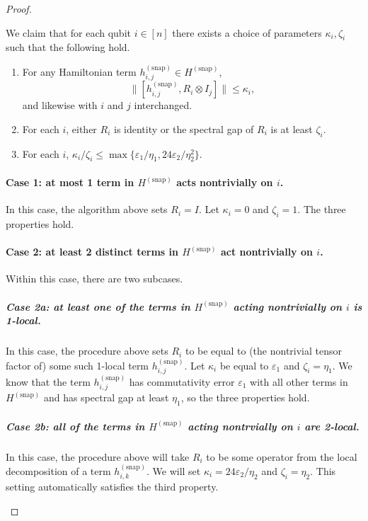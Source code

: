 \documentclass[a4paper,onecolumn,11pt]{quantumarticle}
\theoremstyle{plain}
\newcommand{\eps}{\varepsilon}
\newcommand{\snp}{{(\mathrm{snap})}}
\begin{document}
\begin{proof}
\begin{enumerate}
\begin{enumerate}
    \end{enumerate}
    We claim that for each qubit $i \in [n]$ there exists a choice of parameters $\kappa_i, \zeta_i$ such that the following hold.
    \begin{enumerate}
        \item[1.] For any Hamiltonian term $h^\snp_{i,j} \in H^\snp$,
        \[ \|[ h^\snp_{i,j}, R_i \otimes I_j] \| \leq \kappa_i, \]
        and likewise with $i$ and $j$ interchanged.
        \item[2.] For each $i$, either $R_i$ is identity or the spectral gap of $R_i$ is at least $\zeta_i$.
        \item[3.] For each $i$, $\kappa_i/\zeta_i \leq \max\{ \eps_1 /\eta_1, 24\eps_2/\eta_2^2\}$.
    \end{enumerate}
    
    \paragraph{Case 1: at most 1 term in $H^\snp$ acts nontrivially on $i$.} In this case, the algorithm above sets $R_i = I$. Let $\kappa_i = 0$ and $\zeta_i = 1$. The three properties hold.


\paragraph{Case 2: at least 2 distinct terms in $H^\snp$ act nontrivially on $i$.}

Within this case, there are two subcases.

\subparagraph{Case 2a: at least one of the terms in $H^\snp$ acting nontrivially on $i$ is 1-local.}

In this case, the procedure above sets $R_i$ to be equal to (the nontrivial tensor factor of) some such 1-local term $h^\snp_{i,j}$. Let $\kappa_i$ be equal to $\eps_1$ and $\zeta_i = \eta_1$. We know that the term $h^\snp_{i,j}$ has commutativity error $\eps_1$ with all other terms in $H^\snp$ and has spectral gap at least $\eta_1$, so the three properties hold.

\subparagraph{Case 2b: all of the terms in $H^\snp$ acting nontrvially on $i$ are 2-local.}

In this case, the procedure above will take $R_i$ to be some operator from the local decomposition of a term $h^\snp_{i,k}$. We will set $\kappa_i = 24\eps_2/\eta_2$ and $\zeta_i = \eta_2$. This setting automatically satisfies the third property.


\end{enumerate}
\end{proof}
\end{document}
